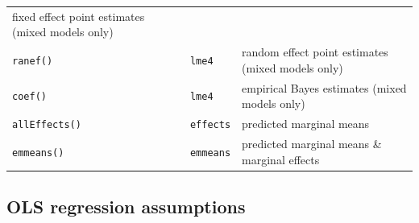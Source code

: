 \documentclass[]{book}
\begin{document}
\begin{longtable}[]{@{}lll@{}}
\begin{minipage}[t]{0.59\columnwidth}
fixed effect point estimates (mixed models only)\strut
\end{minipage}\tabularnewline
\begin{minipage}[t]{0.16\columnwidth}\raggedright
\texttt{ranef()}\strut
\end{minipage} & \begin{minipage}[t]{0.17\columnwidth}\raggedright
\texttt{lme4}\strut
\end{minipage} & \begin{minipage}[t]{0.59\columnwidth}\raggedright
random effect point estimates (mixed models only)\strut
\end{minipage}\tabularnewline
\begin{minipage}[t]{0.16\columnwidth}\raggedright
\texttt{coef()}\strut
\end{minipage} & \begin{minipage}[t]{0.17\columnwidth}\raggedright
\texttt{lme4}\strut
\end{minipage} & \begin{minipage}[t]{0.59\columnwidth}\raggedright
empirical Bayes estimates (mixed models only)\strut
\end{minipage}\tabularnewline
\begin{minipage}[t]{0.16\columnwidth}\raggedright
\texttt{allEffects()}\strut
\end{minipage} & \begin{minipage}[t]{0.17\columnwidth}\raggedright
\texttt{effects}\strut
\end{minipage} & \begin{minipage}[t]{0.59\columnwidth}\raggedright
predicted marginal means\strut
\end{minipage}\tabularnewline
\begin{minipage}[t]{0.16\columnwidth}\raggedright
\texttt{emmeans()}\strut
\end{minipage} & \begin{minipage}[t]{0.17\columnwidth}\raggedright
\texttt{emmeans}\strut
\end{minipage} & \begin{minipage}[t]{0.59\columnwidth}\raggedright
predicted marginal means \& marginal effects\strut
\end{minipage}\tabularnewline
\bottomrule
\end{longtable}

\hypertarget{ols-regression-assumptions}{%
\subsection{OLS regression assumptions}\label{ols-regression-assumptions}}
\end{document}
